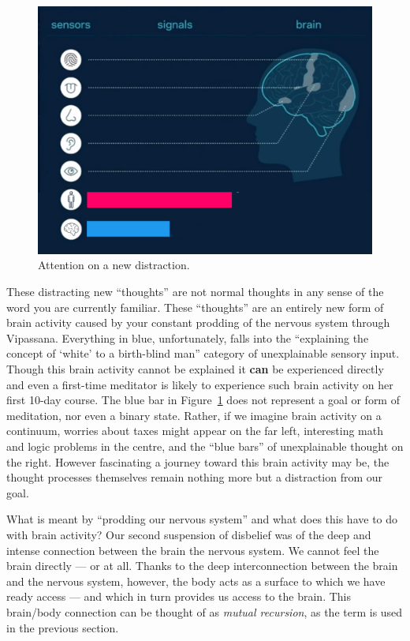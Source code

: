 \documentclass{article}
\begin{document}
\begin{figure}[h]
  \centering
  \includegraphics[width=\linewidth]{images/ma-vipassana3.png}
  \caption{Attention on a new distraction.}
  \label{fig:vipassana-sense-map-2}
\end{figure}

These distracting new ``thoughts'' are not normal thoughts in any sense of the word you are currently familiar. These ``thoughts'' are an entirely new form of brain activity caused by your constant prodding of the nervous system through Vipassana. Everything in blue, unfortunately, falls into the ``explaining the concept of `white' to a birth-blind man'' category of unexplainable sensory input. Though this brain activity cannot be explained it \textbf{can} be experienced directly and even a first-time meditator is likely to experience such brain activity on her first 10-day course. The blue bar in Figure~\ref{fig:vipassana-sense-map-2} does not represent a goal or form of meditation, nor even a binary state. Rather, if we imagine brain activity on a continuum, worries about taxes might appear on the far left, interesting math and logic problems in the centre, and the ``blue bars'' of unexplainable thought on the right. However fascinating a journey toward this brain activity may be, the thought processes themselves remain nothing more but a distraction from our goal.

What is meant by ``prodding our nervous system'' and what does this have to do with brain activity? Our second suspension of disbelief was of the deep and intense connection between the brain the nervous system. We cannot feel the brain directly --- or at all. Thanks to the deep interconnection between the brain and the nervous system, however, the body acts as a surface to which we have ready access --- and which in turn provides us access to the brain. This brain/body connection can be thought of as \textit{mutual recursion}, as the term is used in the previous section.
\end{document}

